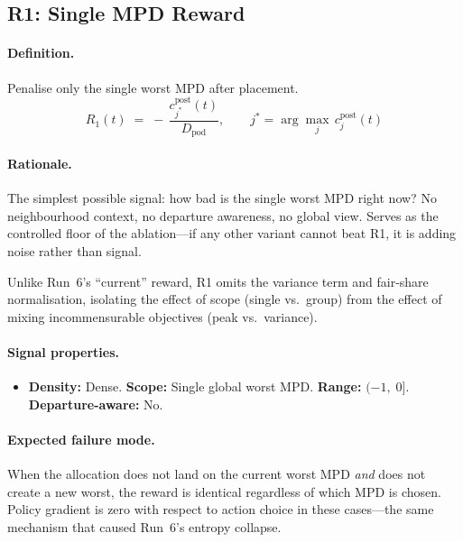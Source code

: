 \documentclass[11pt]{article}
\begin{document}
\subsection{R1: Single MPD Reward}
\label{sec:r1}

\paragraph{Definition.}
Penalise only the single worst MPD after placement.
\begin{equation}
\boxed{
  R_1(t)
  \;=\;
  -\,\frac{c_{j^*}^{\text{post}}(t)}{D_{\text{pod}}},
  \qquad
  j^* = \arg\max_{j}\, c_j^{\text{post}}(t)
}
\label{eq:r1}
\end{equation}

\paragraph{Rationale.}
The simplest possible signal: how bad is the single worst MPD right now?
No neighbourhood context, no departure awareness, no global view.  Serves
as the controlled floor of the ablation---if any other variant cannot beat
R1, it is adding noise rather than signal.

Unlike Run~6's ``current'' reward, R1 omits the variance term and
fair-share normalisation, isolating the effect of scope (single vs.\
group) from the effect of mixing incommensurable objectives (peak vs.\
variance).

\paragraph{Signal properties.}
\begin{itemize}
  \item \textbf{Density:} Dense. \quad \textbf{Scope:} Single global worst
        MPD. \quad \textbf{Range:} $(-1,\; 0]$. \quad
        \textbf{Departure-aware:} No.
\end{itemize}

\paragraph{Expected failure mode.}
When the allocation does not land on the current worst MPD \emph{and} does
not create a new worst, the reward is identical regardless of which MPD is
chosen.  Policy gradient is zero with respect to action choice in these
cases---the same mechanism that caused Run~6's entropy collapse.
\end{document}
